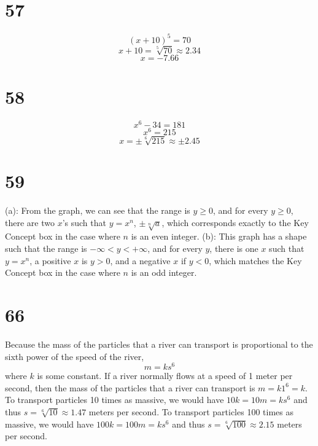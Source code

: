 \documentclass{article}
\theoremstyle{definition}
\begin{document}
\section*{57}
\[ (x+10)^5=70 \]
\[ x+10=\sqrt[5]{70}\approx 2.34 \]
\[ x=-7.66 \]

\section*{58}
\[ x^6-34=181 \]
\[ x^6=215 \]
\[ x=\pm\sqrt[6]{215}\approx\pm 2.45 \]

\section*{59}
(a): From the graph, we can see that the range is $y\ge 0$, and for every $y\ge 0$, there are two $x$'s such that $y=x^n$, $\pm\sqrt[n]{a}$, 
which corresponds exactly to the Key Concept 
box in the case where $n$ is an even integer.\newline
(b): This graph has a shape such that the range is $-\infty <y<+\infty$, and for every $y$, there is one $x$ such that $y=x^n$, a positive $x$ is $y>0$, and a negative 
$x$ if $y<0$, which matches the Key Concept box in the case where $n$ is an odd integer.

\section*{66}
Because the mass of the particles that a river can transport is proportional to the sixth power of the speed of the river, \[ m=ks^6 \] where $k$ is some constant. 
If a river normally flows at a speed of 1 meter per second, then the mass of the particles that a river can transport is $m=k1^6=k$. To transport particles 10 times 
as massive, we would have $10k=10m=ks^6$ and thus $s=\sqrt[6]{10}\approx 1.47$ meters per second. 
To transport particles 100 times as massive, we would have $100k=100m=ks^6$ and thus $s=\sqrt[6]{100}\approx 2.15$ meters per second.
\end{document}
